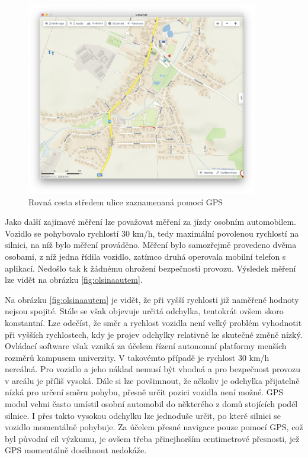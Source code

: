 \documentclass[czech, bachelor]{diploma}
\begin{document}
\begin{figure}
    \centering
    \includegraphics[width=0.9\textwidth]{Figures/louky.png}
    \caption{Rovná cesta středem ulice zaznamenaná pomocí GPS}
    \label{fig:louky}
\end{figure}

Jako další zajímavé měření lze považovat měření za jízdy osobním automobilem. Vozidlo se pohybovalo rychlostí 30 km/h, tedy 
maximální povolenou rychlostí na silnici, na níž bylo měření prováděno. Měření bylo samozřejmě provedeno dvěma osobami, z níž
jedna řídila vozidlo, zatímco druhá operovala mobilní telefon s aplikací. Nedošlo tak k žádnému ohrožení bezpečnosti provozu.
Výsledek měření lze vidět na obrázku \ref{fig:olsinaautem}.

Na obrázku \ref{fig:olsinaautem} je vidět, že při vyšší rychlosti již naměřené hodnoty nejsou spojité. Stále se však objevuje 
určitá odchylka, tentokrát ovšem skoro konstantní. Lze odečíst, že směr a rychlost vozidla není velký problém vyhodnotit při 
vyšších rychlostech, kdy je projev odchylky relativně ke skutečné změně nízký. Ovládací software však vzniká za účelem řízení
autonomní platformy menších rozměrů kampusem univerzity. V takovémto případě je rychlost 30 km/h nereálná. Pro vozidlo a jeho 
náklad nemusí být vhodná a pro bezpečnost provozu v areálu je příliš vysoká. Dále si lze povšimnout, že ačkoliv je odchylka 
přijatelně nízká pro určení směru pohybu, přesně určit pozici vozidla není možné. GPS modul velmi často umístil osobní automobil
do některého z domů stojících podél silnice. I přes takto vysokou odchylku lze jednoduše určit, po které silnici se vozidlo 
momentálně pohybuje. Za účelem přesné navigace pouze pomocí GPS, což byl původní cíl výzkumu, je ovšem třeba přinejhorším 
centimetrové přesnosti, jež GPS momentálně dosáhnout nedokáže.
\end{document}
